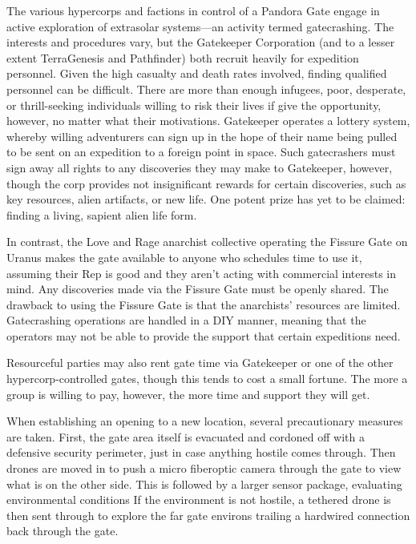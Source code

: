 The various hypercorps and factions in control of a 
Pandora Gate engage in active exploration of extrasolar
systems—an activity termed gatecrashing. The
interests and procedures vary, but the Gatekeeper 
Corporation (and to a lesser extent TerraGenesis 
and Pathfinder) both recruit heavily for expedition 
personnel. Given the high casualty and death rates 
involved, finding qualified personnel can be difficult. 
There are more than enough infugees, poor, desperate, 
or thrill-seeking individuals willing to risk their lives 
if give the opportunity, however, no matter what their 
motivations. Gatekeeper operates a lottery system, 
whereby willing adventurers can sign up in the hope 
of their name being pulled to be sent on an expedition 
to a foreign point in space. Such gatecrashers must 
sign away all rights to any discoveries they may make 
to Gatekeeper, however, though the corp provides not 
insignificant rewards for certain discoveries, such as 
key resources, alien artifacts, or new life. One potent 
prize has yet to be claimed: finding a living, sapient 
alien life form.

In contrast, the Love and Rage anarchist collective 
operating the Fissure Gate on Uranus makes the gate 
available to anyone who schedules time to use it, assuming
their Rep is good and they aren't acting with
commercial interests in mind. Any discoveries made 
via the Fissure Gate must be openly shared. The drawback
to using the Fissure Gate is that the anarchists'
resources are limited. Gatecrashing operations are 
handled in a DIY manner, meaning that the operators 
may not be able to provide the support that certain 
expeditions need.

Resourceful parties may also rent gate time via 
Gatekeeper or one of the other hypercorp-controlled 
gates, though this tends to cost a small fortune. The 
more a group is willing to pay, however, the more time 
and support they will get.

When establishing an opening to a new location, 
several precautionary measures are taken. First, the 
gate area itself is evacuated and cordoned off with 
a defensive security perimeter, just in case anything 
hostile comes through. Then drones are moved in to 
push a micro fiberoptic camera through the gate to 
view what is on the other side. This is followed by a 
larger sensor package, evaluating environmental conditions
If the environment is not hostile, a tethered
drone is then sent through to explore the far gate environs
trailing a hardwired connection back through
the gate. 

